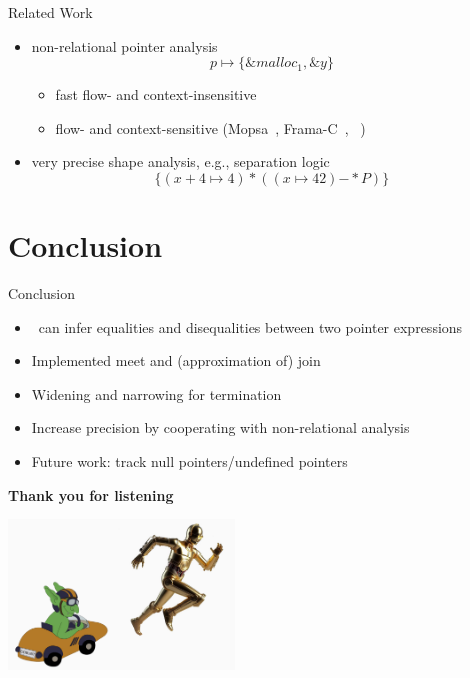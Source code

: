 \documentclass[aspectratio=169]{beamer}
\begin{document}
\begin{frame}{Related Work}
    \begin{itemize}
        \item non-relational pointer analysis
        \[
        p \mapsto \{ \&malloc_1, \&y \}
        \]
        \begin{itemize}
            \item fast flow- and context-insensitive \cite{Steensgaard,Andersen}
            \item flow- and context-sensitive (Mopsa~\cite{mopsa},
            Frama-C~\cite{framac}, \goblint~\cite{goblint})
        \end{itemize}
        \pause
        \item very precise shape analysis, e.g., separation logic~\cite{separationlogic,rivalpapers}
        \[
             \{(x + 4 \mapsto 4)\ast ((x\mapsto 42){-\!\!*}P)\}
        \]

    \end{itemize}
\end{frame}

\section{Conclusion}

\begin{frame}{Conclusion}
    \begin{itemize}
        \item \cpo\ can infer equalities and disequalities between two pointer expressions %
        \pause
        \item Implemented meet and (approximation of) join
        \pause
        \item Widening and narrowing for termination
        \pause
        \item Increase precision by cooperating with non-relational analysis
        \pause
        \item Future work: track null pointers/undefined pointers
    \end{itemize}
\end{frame}

\begin{frame}
    \centering
\huge
       \textbf{Thank you for listening}


\includegraphics[width=6cm]{images/Goblint car with C-3PO-presentation3.png}
\end{frame}
\end{document}
